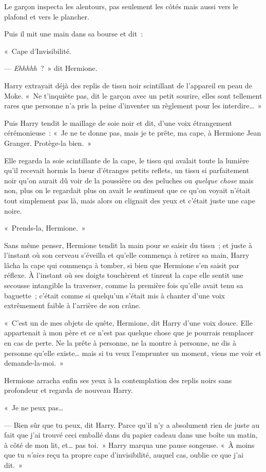 Le garçon inspecta les alentours, pas seulement les côtés mais aussi vers le plafond et vers le plancher.

Puis il mit une main dans sa bourse et dit~:

«~Cape d'Invisibilité.

--- \emph{Ehhhhh}~?~» dit Hermione.

Harry extrayait déjà des replis de tissu noir scintillant de l'appareil en peau de Moke. «~Ne t'inquiète pas, dit le garçon avec un petit sourire, elles sont tellement rares que personne n'a pris la peine d'inventer un règlement pour les interdire…~»

Puis Harry tendit le maillage de soie noir et dit, d'une voix étrangement cérémonieuse~: «~Je ne te donne pas, mais je te prête, ma cape, à Hermione Jean Granger. Protège-la bien.~»

Elle regarda la soie scintillante de la cape, le tissu qui avalait toute la lumière qu'il recevait hormis la lueur d'étranges petits reflets, un tissu si parfaitement noir qu'on aurait dû voir de la poussière ou des peluches ou \emph{quelque chose} mais non, plus on le regardait plus on avait le sentiment que ce qu'on voyait n'était tout simplement pas là, mais alors on clignait des yeux et c'était juste une cape noire.

«~Prends-la, Hermione.~»

Sans même penser, Hermione tendit la main pour se saisir du tissu~; et juste à l'instant où son cerveau s'éveilla et qu'elle commença à retirer sa main, Harry lâcha la cape qui commença à tomber, si bien que Hermione s'en saisit par réflexe. À l'instant où ses doigts touchèrent et tinrent la cape elle sentit une secousse intangible la traverser, comme la première fois qu'elle avait tenu sa baguette~; c'était comme si quelqu'un s'était mis à chanter d'une voix extrêmement faible à l'arrière de son crâne.

«~C'est un de mes objets de quête, Hermione, dit Harry d'une voix douce. Elle appartenait à mon père et ce n'est pas quelque chose que je pourrais remplacer en cas de perte. Ne la prête à personne, ne la montre à personne, ne dis à personne qu'elle existe… mais si tu veux l'emprunter un moment, viens me voir et demande-la-moi.~»

Hermione arracha enfin ses yeux à la contemplation des replis noirs sans profondeur et regarda de nouveau Harry.

«~Je ne peux pas…

--- Bien sûr que tu peux, dit Harry. Parce qu'il n'y a absolument rien de juste au fait que j'ai trouvé ceci emballé dans du papier cadeau dans une boîte un matin, à côté de mon lit, et… pas toi.~» Harry marqua une pause songeuse. «~À moins que tu \emph{n'aies} reçu ta propre cape d'invisibilité, auquel cas, oublie ce que j'ai dit.~»

